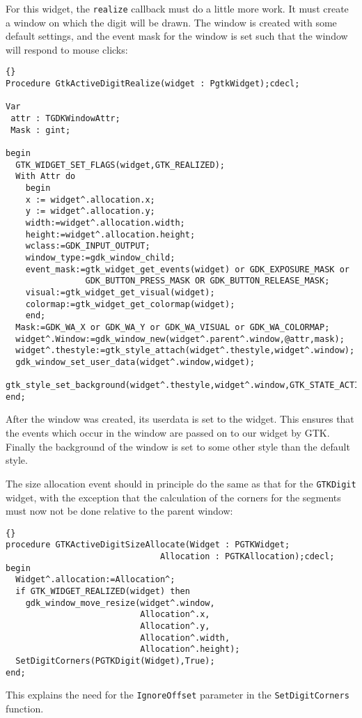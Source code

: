 \documentclass[10pt]{article}
\begin{document}
For this widget, the \lstinline|realize| callback must do a little more
work. It must create a window on which the digit will be drawn. The window
is created with some default settings, and the event mask for the window
is set such that the window will respond to mouse clicks:
\begin{lstlisting}{}
Procedure GtkActiveDigitRealize(widget : PgtkWidget);cdecl;

Var
 attr : TGDKWindowAttr;
 Mask : gint;
 
begin
  GTK_WIDGET_SET_FLAGS(widget,GTK_REALIZED);
  With Attr do
    begin
    x := widget^.allocation.x;
    y := widget^.allocation.y;
    width:=widget^.allocation.width;
    height:=widget^.allocation.height;
    wclass:=GDK_INPUT_OUTPUT;
    window_type:=gdk_window_child;
    event_mask:=gtk_widget_get_events(widget) or GDK_EXPOSURE_MASK or
                GDK_BUTTON_PRESS_MASK OR GDK_BUTTON_RELEASE_MASK;
    visual:=gtk_widget_get_visual(widget);
    colormap:=gtk_widget_get_colormap(widget);
    end;
  Mask:=GDK_WA_X or GDK_WA_Y or GDK_WA_VISUAL or GDK_WA_COLORMAP;
  widget^.Window:=gdk_window_new(widget^.parent^.window,@attr,mask);
  widget^.thestyle:=gtk_style_attach(widget^.thestyle,widget^.window);
  gdk_window_set_user_data(widget^.window,widget);  
  gtk_style_set_background(widget^.thestyle,widget^.window,GTK_STATE_ACTIVE);
end;
\end{lstlisting}
After the window was created, its userdata is set to the widget. This
ensures that the events which occur in the window are passed on to our 
widget by GTK. Finally the background of the window is set to some
other style than the default style.

The size allocation event should in principle do the same as that for the
\lstinline|GTKDigit| widget, with the exception that the calculation of the
corners for the segments must now not be done relative to the parent window:
\begin{lstlisting}{}
procedure GTKActiveDigitSizeAllocate(Widget : PGTKWidget;
                               Allocation : PGTKAllocation);cdecl;
begin
  Widget^.allocation:=Allocation^;
  if GTK_WIDGET_REALIZED(widget) then
    gdk_window_move_resize(widget^.window,
                           Allocation^.x,
                           Allocation^.y,
                           Allocation^.width,
                           Allocation^.height);
  SetDigitCorners(PGTKDigit(Widget),True);
end;
\end{lstlisting}
This explains the need for the \lstinline|IgnoreOffset| parameter in the
\lstinline|SetDigitCorners| function.
\end{document}

